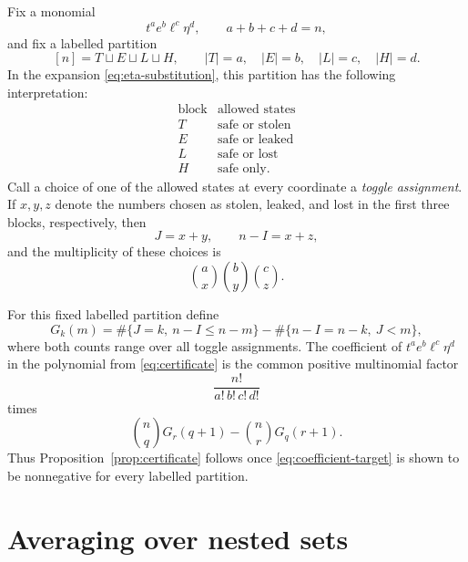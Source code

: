 \documentclass[11pt]{article}
\newcommand{\1}{\mathbf 1}
\begin{document}
Fix a monomial
\[
t^a e^b\ell^c\eta^d,
\qquad
a+b+c+d=n,
\]
and fix a labelled partition
\[
[n]=T\sqcup E\sqcup L\sqcup H,
\qquad
|T|=a,\quad |E|=b,\quad |L|=c,\quad |H|=d.
\]
In the expansion \eqref{eq:eta-substitution}, this partition has the
following interpretation:
\[
\begin{array}{c|c}
\text{block}&\text{allowed states}\\
\hline
T&\text{safe or stolen}\\
E&\text{safe or leaked}\\
L&\text{safe or lost}\\
H&\text{safe only}.
\end{array}
\]
Call a choice of one of the allowed states at every coordinate a
\emph{toggle assignment}.  If $x,y,z$ denote the numbers chosen as
stolen, leaked, and lost in the first three blocks, respectively, then
\begin{equation}\label{eq:toggle-ranks}
J=x+y,
\qquad
n-I=x+z,
\end{equation}
and the multiplicity of these choices is
\[
\binom ax\binom by\binom cz.
\]

For this fixed labelled partition define
\begin{equation}\label{eq:def-G}
G_k(m)
=\#\{J=k,\ n-I\leq n-m\}
-\#\{n-I=n-k,\ J<m\},
\end{equation}
where both counts range over all toggle assignments.  The coefficient
of $t^ae^b\ell^c\eta^d$ in the polynomial from
\eqref{eq:certificate} is the common positive multinomial factor
\[
\frac{n!}{a!\,b!\,c!\,d!}
\]
times
\begin{equation}\label{eq:coefficient-target}
\binom nqG_r(q+1)-\binom nrG_q(r+1).
\end{equation}
Thus Proposition~\ref{prop:certificate} follows once
\eqref{eq:coefficient-target} is shown to be nonnegative for every
labelled partition.

\section{Averaging over nested sets}
\end{document}
